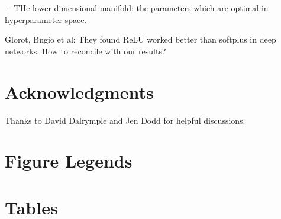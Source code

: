 \documentclass[10pt]{article}
\begin{document}
+ THe lower dimensional manifold: the parameters which are optimal in
hyperparameter space.


Glorot, Bngio et al: They found ReLU worked better than softplus in
deep networks.  How to reconcile with our results?

\section*{Acknowledgments}

Thanks to David Dalrymple and Jen Dodd for helpful discussions.



\section*{Figure Legends}


\section*{Tables}
\end{document}
